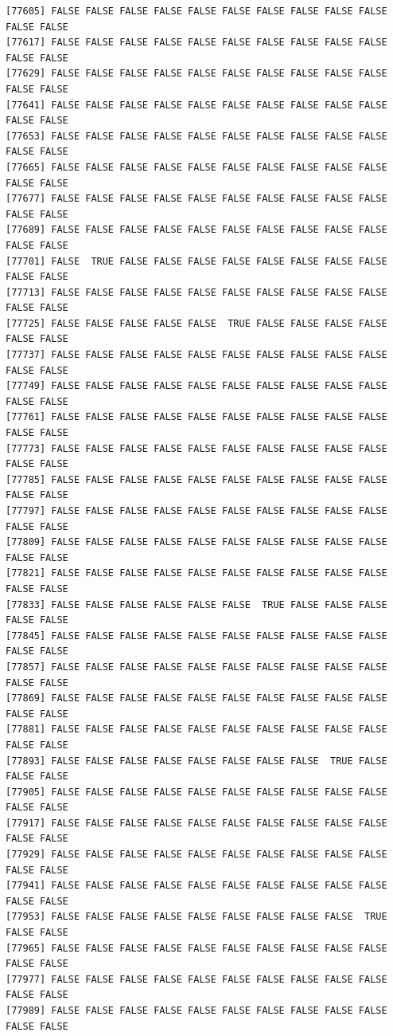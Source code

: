 \documentclass[
  a4paper,
  DIV=11,
  numbers=noendperiod]{scrartcl}
\begin{document}
\begin{verbatim}
[77605] FALSE FALSE FALSE FALSE FALSE FALSE FALSE FALSE FALSE FALSE FALSE FALSE
[77617] FALSE FALSE FALSE FALSE FALSE FALSE FALSE FALSE FALSE FALSE FALSE FALSE
[77629] FALSE FALSE FALSE FALSE FALSE FALSE FALSE FALSE FALSE FALSE FALSE FALSE
[77641] FALSE FALSE FALSE FALSE FALSE FALSE FALSE FALSE FALSE FALSE FALSE FALSE
[77653] FALSE FALSE FALSE FALSE FALSE FALSE FALSE FALSE FALSE FALSE FALSE FALSE
[77665] FALSE FALSE FALSE FALSE FALSE FALSE FALSE FALSE FALSE FALSE FALSE FALSE
[77677] FALSE FALSE FALSE FALSE FALSE FALSE FALSE FALSE FALSE FALSE FALSE FALSE
[77689] FALSE FALSE FALSE FALSE FALSE FALSE FALSE FALSE FALSE FALSE FALSE FALSE
[77701] FALSE  TRUE FALSE FALSE FALSE FALSE FALSE FALSE FALSE FALSE FALSE FALSE
[77713] FALSE FALSE FALSE FALSE FALSE FALSE FALSE FALSE FALSE FALSE FALSE FALSE
[77725] FALSE FALSE FALSE FALSE FALSE  TRUE FALSE FALSE FALSE FALSE FALSE FALSE
[77737] FALSE FALSE FALSE FALSE FALSE FALSE FALSE FALSE FALSE FALSE FALSE FALSE
[77749] FALSE FALSE FALSE FALSE FALSE FALSE FALSE FALSE FALSE FALSE FALSE FALSE
[77761] FALSE FALSE FALSE FALSE FALSE FALSE FALSE FALSE FALSE FALSE FALSE FALSE
[77773] FALSE FALSE FALSE FALSE FALSE FALSE FALSE FALSE FALSE FALSE FALSE FALSE
[77785] FALSE FALSE FALSE FALSE FALSE FALSE FALSE FALSE FALSE FALSE FALSE FALSE
[77797] FALSE FALSE FALSE FALSE FALSE FALSE FALSE FALSE FALSE FALSE FALSE FALSE
[77809] FALSE FALSE FALSE FALSE FALSE FALSE FALSE FALSE FALSE FALSE FALSE FALSE
[77821] FALSE FALSE FALSE FALSE FALSE FALSE FALSE FALSE FALSE FALSE FALSE FALSE
[77833] FALSE FALSE FALSE FALSE FALSE FALSE  TRUE FALSE FALSE FALSE FALSE FALSE
[77845] FALSE FALSE FALSE FALSE FALSE FALSE FALSE FALSE FALSE FALSE FALSE FALSE
[77857] FALSE FALSE FALSE FALSE FALSE FALSE FALSE FALSE FALSE FALSE FALSE FALSE
[77869] FALSE FALSE FALSE FALSE FALSE FALSE FALSE FALSE FALSE FALSE FALSE FALSE
[77881] FALSE FALSE FALSE FALSE FALSE FALSE FALSE FALSE FALSE FALSE FALSE FALSE
[77893] FALSE FALSE FALSE FALSE FALSE FALSE FALSE FALSE  TRUE FALSE FALSE FALSE
[77905] FALSE FALSE FALSE FALSE FALSE FALSE FALSE FALSE FALSE FALSE FALSE FALSE
[77917] FALSE FALSE FALSE FALSE FALSE FALSE FALSE FALSE FALSE FALSE FALSE FALSE
[77929] FALSE FALSE FALSE FALSE FALSE FALSE FALSE FALSE FALSE FALSE FALSE FALSE
[77941] FALSE FALSE FALSE FALSE FALSE FALSE FALSE FALSE FALSE FALSE FALSE FALSE
[77953] FALSE FALSE FALSE FALSE FALSE FALSE FALSE FALSE FALSE  TRUE FALSE FALSE
[77965] FALSE FALSE FALSE FALSE FALSE FALSE FALSE FALSE FALSE FALSE FALSE FALSE
[77977] FALSE FALSE FALSE FALSE FALSE FALSE FALSE FALSE FALSE FALSE FALSE FALSE
[77989] FALSE FALSE FALSE FALSE FALSE FALSE FALSE FALSE FALSE FALSE FALSE FALSE

\end{verbatim}
\end{document}
